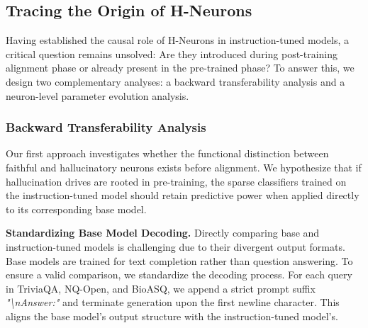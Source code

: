 \documentclass[dvipsnames]{article}
\begin{document}
\subsection{Tracing the Origin of H-Neurons}
Having established the causal role of H-Neurons in instruction-tuned models, a critical question remains unsolved: Are they introduced during post-training alignment phase or already present in the pre-trained phase? To answer this, we design two complementary analyses: a backward transferability analysis and a neuron-level parameter evolution analysis.



\subsubsection{Backward Transferability Analysis}
Our first approach investigates whether the functional distinction between faithful and hallucinatory neurons exists before alignment. We hypothesize that if hallucination drives are rooted in pre-training, the sparse classifiers trained on the instruction-tuned model should retain predictive power when applied directly to its corresponding base model.

\textbf{Standardizing Base Model Decoding.}\quad
Directly comparing base and instruction-tuned models is challenging due to their divergent output formats. Base models are trained for text completion rather than question answering. To ensure a valid comparison, we standardize the decoding process. For each query in TriviaQA, NQ-Open, and BioASQ, we append a strict prompt suffix \textit{"\textbackslash nAnswer:"} and terminate generation upon the first newline character. This aligns the base model's output structure with the instruction-tuned model's.


\end{document}
